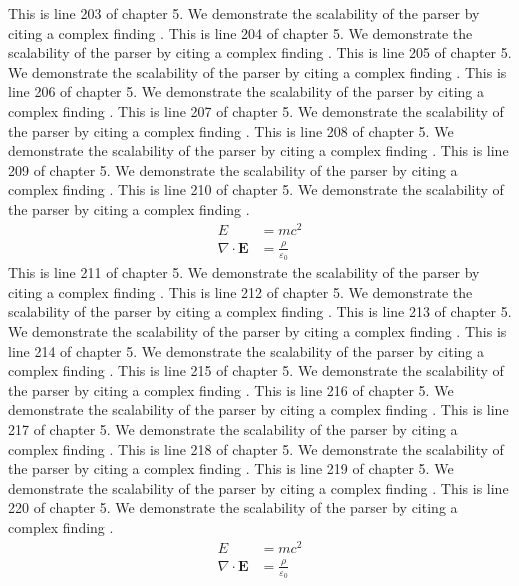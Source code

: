 This is line 203 of chapter 5. We demonstrate the scalability of the parser by citing a complex finding \cite{ref5_203}.
This is line 204 of chapter 5. We demonstrate the scalability of the parser by citing a complex finding \cite{ref5_204}.
This is line 205 of chapter 5. We demonstrate the scalability of the parser by citing a complex finding \cite{ref5_205}.
This is line 206 of chapter 5. We demonstrate the scalability of the parser by citing a complex finding \cite{ref5_206}.
This is line 207 of chapter 5. We demonstrate the scalability of the parser by citing a complex finding \cite{ref5_207}.
This is line 208 of chapter 5. We demonstrate the scalability of the parser by citing a complex finding \cite{ref5_208}.
This is line 209 of chapter 5. We demonstrate the scalability of the parser by citing a complex finding \cite{ref5_209}.
This is line 210 of chapter 5. We demonstrate the scalability of the parser by citing a complex finding \cite{ref5_210}.
\begin{align*}
  E &= mc^2 \\
  \nabla \cdot \mathbf{E} &= \frac{\rho}{\varepsilon_0}
\end{align*}
This is line 211 of chapter 5. We demonstrate the scalability of the parser by citing a complex finding \cite{ref5_211}.
This is line 212 of chapter 5. We demonstrate the scalability of the parser by citing a complex finding \cite{ref5_212}.
This is line 213 of chapter 5. We demonstrate the scalability of the parser by citing a complex finding \cite{ref5_213}.
This is line 214 of chapter 5. We demonstrate the scalability of the parser by citing a complex finding \cite{ref5_214}.
This is line 215 of chapter 5. We demonstrate the scalability of the parser by citing a complex finding \cite{ref5_215}.
This is line 216 of chapter 5. We demonstrate the scalability of the parser by citing a complex finding \cite{ref5_216}.
This is line 217 of chapter 5. We demonstrate the scalability of the parser by citing a complex finding \cite{ref5_217}.
This is line 218 of chapter 5. We demonstrate the scalability of the parser by citing a complex finding \cite{ref5_218}.
This is line 219 of chapter 5. We demonstrate the scalability of the parser by citing a complex finding \cite{ref5_219}.
This is line 220 of chapter 5. We demonstrate the scalability of the parser by citing a complex finding \cite{ref5_220}.
\begin{align*}
  E &= mc^2 \\
  \nabla \cdot \mathbf{E} &= \frac{\rho}{\varepsilon_0}
\end{align*}
